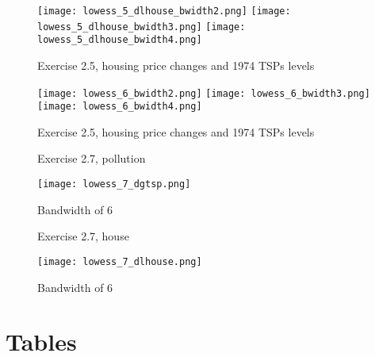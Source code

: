 \documentclass[12pt]{article}
\begin{document}
\clearpage

\begin{figure}[h!]
\centering
\caption{Exercise 2.5, housing price changes and 1974 TSPs levels}
\texttt{[image: lowess\_5\_dlhouse\_bwidth2.png]}
\texttt{[image: lowess\_5\_dlhouse\_bwidth3.png]}
\texttt{[image: lowess\_5\_dlhouse\_bwidth4.png]}
\label{fig_lowess5_house}
\end{figure}

\clearpage

\begin{figure}[h!]
\centering
\caption{Exercise 2.5, housing price changes and 1974 TSPs levels}
\texttt{[image: lowess\_6\_bwidth2.png]}
\texttt{[image: lowess\_6\_bwidth3.png]}
\texttt{[image: lowess\_6\_bwidth4.png]}
\label{fig_lowess6_house}
\end{figure}

\clearpage

\begin{figure}[h!]
\centering
\caption{Exercise 2.7, pollution}
\texttt{[image: lowess\_7\_dgtsp.png]}
\caption*{Bandwidth of 6}
\label{lowess_7_dgtsp}
\end{figure}

\begin{figure}[h!]
\centering
\caption{Exercise 2.7, house}
\texttt{[image: lowess\_7\_dlhouse.png]}
\caption*{Bandwidth of 6}
\label{lowess_7_dlhouse}
\end{figure}


\clearpage

\section*{Tables}



\clearpage



\clearpage



\clearpage



\clearpage



\clearpage


\end{document}
